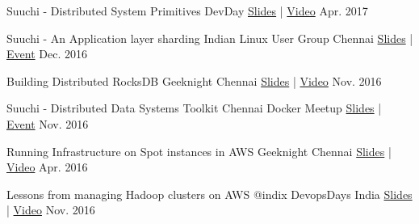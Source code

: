 



\begin{cvhonors}

  \cvhonor
    {Suuchi - Distributed System Primitives} %
    {DevDay} %
    {\href{https://speakerdeck.com/ashwanthkumar/suuchi-distributed-system-primitives}{Slides} | \href{https://www.youtube.com/watch?v=0pW6tAM8rIQ}{Video}} %
    {Apr. 2017} %

  \cvhonor
    {Suuchi - An Application layer sharding} %
    {Indian Linux User Group Chennai} %
    {\href{https://speakerdeck.com/ashwanthkumar/suuchi-application-layer-sharding}{Slides} | \href{https://www.meetup.com/ILUG-C/events/233660958/}{Event}} %
    {Dec. 2016} %

  \cvhonor
    {Building Distributed RocksDB} %
    {Geeknight Chennai} %
    {\href{http://bit.ly/distributed-rocksdb}{Slides} | \href{https://www.youtube.com/watch?v=PSCa9_Avne0}{Video}} %
    {Nov. 2016} %

  \cvhonor
    {Suuchi - Distributed Data Systems Toolkit} %
    {Chennai Docker Meetup} %
    {\href{http://bit.ly/suuchi-toolkit}{Slides} | \href{https://www.meetup.com/docker-Chennai/events/235155974/}{Event}} %
    {Nov. 2016} %

  \cvhonor
    {Running Infrastructure on Spot instances in AWS} %
    {Geeknight Chennai} %
    {\href{http://j.mp/to-matsya-geeknight}{Slides} | \href{https://www.youtube.com/watch?v=qeBV9JRoTOA}{Video}} %
    {Apr. 2016} %

\end{cvhonors}


\begin{cvhonors}

  \cvhonor
    {Lessons from managing Hadoop clusters on AWS @indix} %
    {DevopsDays India} %
    {\href{http://bit.ly/autoscaling-on-aws}{Slides} | \href{https://www.youtube.com/watch?v=eBbgylpRufQ}{Video}} %
    {Nov. 2016} %

\end{cvhonors}
